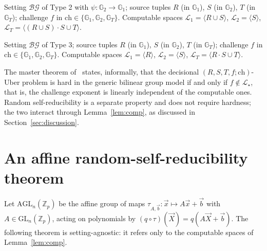 \documentclass{aicr-solution}
\newcommand{\Gone}{\mathbb{G}_1}
\newcommand{\Gtwo}{\mathbb{G}_2}
\newcommand{\GT}{\mathbb{G}_T}
\newcommand{\Zp}{\mathbb{Z}_p}
\newcommand{\vx}{\vec{x}}
\newcommand{\vX}{\vec{X}}
\newcommand{\vb}{\vec{b}}
\newcommand{\LL}{\mathcal{L}}
\newcommand{\Span}[1]{\langle #1 \rangle} %
\newcommand{\GL}{\mathrm{GL}}
\newcommand{\AGL}{\mathrm{AGL}}
\newcommand{\bg}{\mathcal{BG}}
\newcommand{\ch}{\mathrm{ch}}
\begin{document}
\begin{definition}
Setting $\bg$ of Type 2 with $\psi\colon\Gtwo\to\Gone$; source tuples $R$ (in $\Gone$),
$S$ (in $\Gtwo$), $T$ (in $\GT$); challenge $f$ in $\ch\in\{\Gone,\Gtwo,\GT\}$. Computable
spaces $\LL_1=\Span{R\cup S}$, $\LL_2=\Span{S}$,
$\LL_T=\Span{(R\cup S)\cdot S\cup T}$.
\end{definition}

\begin{definition}
Setting $\bg$ of Type 3; source tuples $R$ (in $\Gone$), $S$ (in $\Gtwo$), $T$ (in $\GT$);
challenge $f$ in $\ch\in\{\Gone,\Gtwo,\GT\}$. Computable spaces $\LL_1=\Span{R}$,
$\LL_2=\Span{S}$, $\LL_T=\Span{R\cdot S\cup T}$.
\end{definition}

\begin{remark}[hardness]
The master theorem of~\cite{BBG05,Boyen08} states, informally, that the decisional
$(R,S,T,f;\ch)$-Uber problem is hard in the generic bilinear group model if and only if
$f\notin\LL_\star$, that is, the challenge exponent is linearly independent of the
computable ones. Random self-reducibility is a separate property and does not require
hardness; the two interact through Lemma~\ref{lem:comp}, as discussed in
Section~\ref{sec:discussion}.
\end{remark}

\section{An affine random-self-reducibility theorem}

Let $\AGL_n(\Zp)$ be the affine group of maps $\tau_{A,\vb}\colon\vx\mapsto A\vx+\vb$ with
$A\in\GL_n(\Zp)$, acting on polynomials by $(q\circ\tau)(\vX)=q(A\vX+\vb)$. The following
theorem is setting-agnostic: it refers only to the computable spaces of
Lemma~\ref{lem:comp}.
\end{document}

